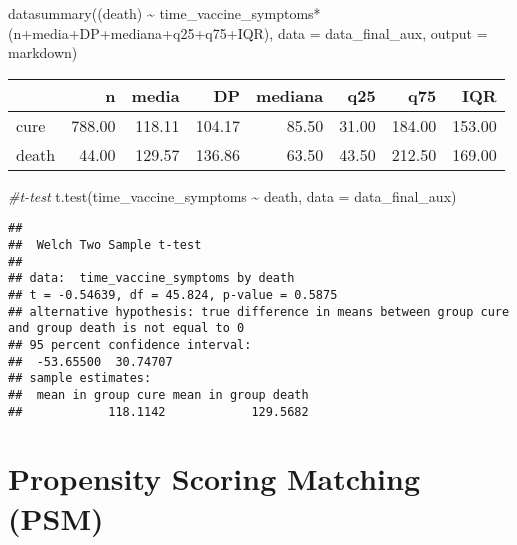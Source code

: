 \documentclass[
]{article}
\newenvironment{Shaded}{\begin{snugshade}}{\end{snugshade}}
\newcommand{\AttributeTok}[1]{\textcolor[rgb]{0.77,0.63,0.00}{#1}}
\newcommand{\CommentTok}[1]{\textcolor[rgb]{0.56,0.35,0.01}{\textit{#1}}}
\newcommand{\FunctionTok}[1]{\textcolor[rgb]{0.00,0.00,0.00}{#1}}
\newcommand{\NormalTok}[1]{#1}
\newcommand{\SpecialCharTok}[1]{\textcolor[rgb]{0.00,0.00,0.00}{#1}}
\newcommand{\StringTok}[1]{\textcolor[rgb]{0.31,0.60,0.02}{#1}}
\begin{document}
\begin{Shaded}
\begin{Highlighting}[]
\FunctionTok{datasummary}\NormalTok{((death) }\SpecialCharTok{\textasciitilde{}}\NormalTok{ time\_vaccine\_symptoms}\SpecialCharTok{*}\NormalTok{(n}\SpecialCharTok{+}\NormalTok{media}\SpecialCharTok{+}\NormalTok{DP}\SpecialCharTok{+}\NormalTok{mediana}\SpecialCharTok{+}\NormalTok{q25}\SpecialCharTok{+}\NormalTok{q75}\SpecialCharTok{+}\NormalTok{IQR),}
            \AttributeTok{data =}\NormalTok{ data\_final\_aux, }\AttributeTok{output =} \StringTok{\textquotesingle{}markdown\textquotesingle{}}\NormalTok{)}
\end{Highlighting}
\end{Shaded}

\begin{longtable}[]{@{}lrrrrrrr@{}}
\toprule
& n & media & DP & mediana & q25 & q75 & IQR \\
\midrule
\endhead
cure & 788.00 & 118.11 & 104.17 & 85.50 & 31.00 & 184.00 & 153.00 \\
death & 44.00 & 129.57 & 136.86 & 63.50 & 43.50 & 212.50 & 169.00 \\
\bottomrule
\end{longtable}

\begin{Shaded}
\begin{Highlighting}[]
\CommentTok{\#t{-}test}
\FunctionTok{t.test}\NormalTok{(time\_vaccine\_symptoms }\SpecialCharTok{\textasciitilde{}}\NormalTok{ death, }\AttributeTok{data =}\NormalTok{ data\_final\_aux)}
\end{Highlighting}
\end{Shaded}

\begin{verbatim}
## 
##  Welch Two Sample t-test
## 
## data:  time_vaccine_symptoms by death
## t = -0.54639, df = 45.824, p-value = 0.5875
## alternative hypothesis: true difference in means between group cure and group death is not equal to 0
## 95 percent confidence interval:
##  -53.65500  30.74707
## sample estimates:
##  mean in group cure mean in group death 
##            118.1142            129.5682
\end{verbatim}

\hypertarget{propensity-scoring-matching-psm}{%
\section{Propensity Scoring Matching
(PSM)}\label{propensity-scoring-matching-psm}}
\end{document}
